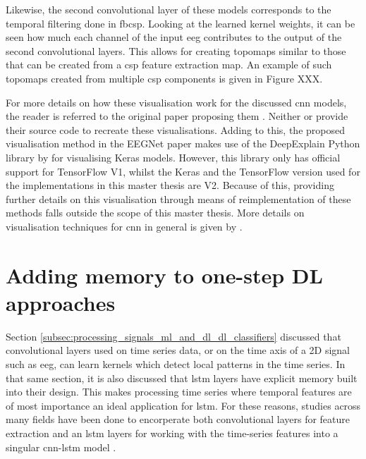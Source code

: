 Likewise, the second convolutional layer of these models corresponds to the temporal filtering done in \gls{fbcsp}.
Looking at the learned kernel weights, it can be seen how much each channel of the input \gls{eeg} contributes to the output of the second convolutional layers.
This allows for creating \glspl{topomap} similar to those that can be created from a \gls{csp} feature extraction map.
An example of such \glspl{topomap} created from multiple \gls{csp} components is given in Figure XXX. %

For more details on how these visualisation work for the discussed \gls{cnn} models, the reader is referred to the original paper proposing them \citep{eeg_model_eegnet,eeg_model_hbm}.
Neither \citet[][Authors of EEGNet ]{eeg_model_eegnet} or \citet[][Authors of DeepConvNet and ShallowConvNet ]{eeg_model_hbm} provide their source code to recreate these visualisations.
Adding to this, the proposed visualisation method in the EEGNet paper makes use of the DeepExplain Python library by \citep{deepexplain} for visualising Keras models.
However, this library only has official support for TensorFlow V1, whilst the Keras and the TensorFlow version used for the implementations in this master thesis are V2.
Because of this, providing further details on this visualisation through means of reimplementation of these methods falls outside the scope of this master thesis.
More details on visualisation techniques for \gls{cnn} in general is given by \citet{cnn_visualisations}.

\section{Adding memory to one-step DL approaches}
\label{sec:offline_bci_system_adding_memory}

Section \ref{subsec:processing_signals_ml_and_dl_dl_classifiers} discussed that convolutional layers used on time series data, or on the time axis of a 2D signal such as \gls{eeg}, can learn kernels which detect local patterns in the time series.
In that same section, it is also discussed that \gls{lstm} layers have explicit memory built into their design.
This makes processing time series where temporal features are of most importance an ideal application for \gls{lstm}.
For these reasons, studies across many fields have been done to encorperate both convolutional layers for feature extraction and an \gls{lstm} layers for working with the time-series features into a singular \gls{cnn}-\gls{lstm} model \citep{lstm_cnn_mi_eeg, cnn_bilstm_eeg_robot_arm}.

